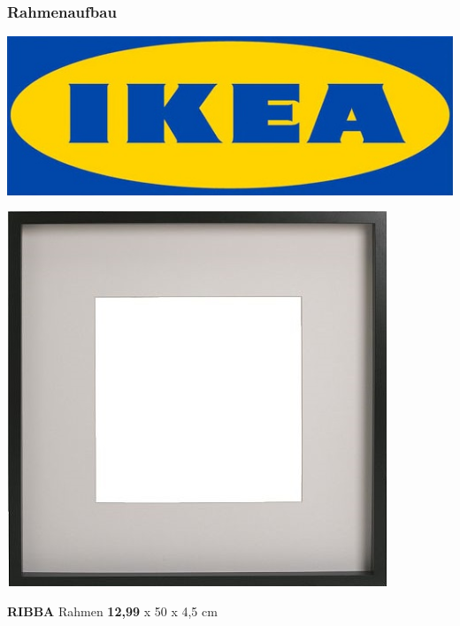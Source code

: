 \documentclass[11pt]{beamer}
\begin{document}
	\begin{frame}
		\frametitle{Rahmenaufbau}
		\begin{center}
			\includegraphics[scale = 0.2]{images/ikea.jpg}
		\end{center}
		\begin{center}
			\begin{minipage}[b]{0.4\textwidth}
				\includegraphics[scale = 0.35]{images/ribba-rahmen-schwarz.jpg}
			\end{minipage}
			\begin{minipage}[b]{0.4\textwidth}
				\textbf{RIBBA} \linebreak
				Rahmen \linebreak
				\textbf{12,99}  x 50 x 4,5 cm
			\end{minipage}
		\end{center}
	\end{frame}	
	
\end{document}
